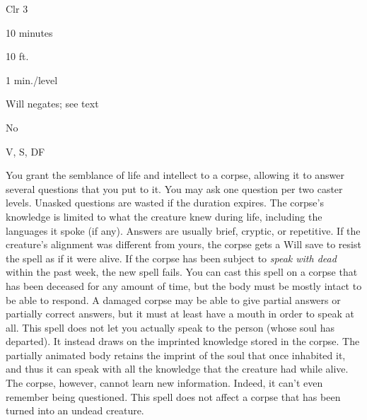 
\begin{description*}
\item[Level:] Clr 3
\item[Casting Time:] 10 minutes
\item[Range:] 10 ft.
\item[Duration:] 1 min./level
\item[Saving Throw:] Will negates; see text
\item[Spell Resistance:] No
\item[Components:] V, S, DF
\end{description*}

You grant the semblance of life and intellect to a corpse, allowing it to answer
several questions that you put to it. You may ask one question per two caster levels.
Unasked questions are wasted if the duration expires. The corpse's knowledge is
limited to what the creature knew during life, including the languages it spoke
(if any). Answers are usually brief, cryptic, or repetitive. If the creature's
alignment was different from yours, the corpse gets a Will save to resist the spell
as if it were alive.
If the corpse has been subject to \textit{speak with dead} within the past week,
the new spell fails. You can cast this spell on a corpse that has been deceased
for any amount of time, but the body must be mostly intact to be able to respond.
A damaged corpse may be able to give partial answers or partially correct answers,
but it must at least have a mouth in order to speak at all.
This spell does not let you actually speak to the person (whose soul has departed).
It instead draws on the imprinted knowledge stored in the corpse. The partially
animated body retains the imprint of the soul that once inhabited it, and thus
it can speak with all the knowledge that the creature had while alive. The corpse,
however, cannot learn new information.
Indeed, it can't even remember being questioned.
This spell does not affect a corpse that has been turned into an undead creature.